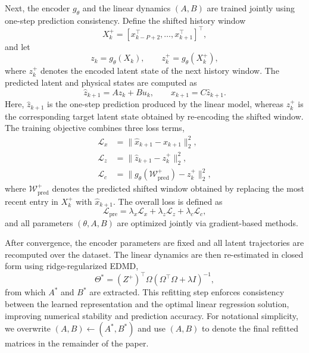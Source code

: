 \documentclass[journal]{IEEEtran}
\begin{document}
Next, the encoder $g_\theta$ and the linear dynamics $(A,B)$ are trained jointly using one-step prediction consistency. Define the shifted history window
\begin{equation}
    X_k^{+} = [x_{k-P+2}^\top,\ldots,x_{k+1}^\top]^\top,
\end{equation}
and let
\begin{equation}
    z_k = g_\theta(X_k), \qquad
    z_k^{+} = g_\theta(X_k^{+}),
\end{equation}
where $z_k^{+}$ denotes the encoded latent state of the next history window. The predicted latent and physical states are computed as
\begin{equation}
    \hat{z}_{k+1} = A z_k + B u_k,
    \qquad
    \hat{x}_{k+1} = C \hat{z}_{k+1}.
\end{equation}
Here, $\hat{z}_{k+1}$ is the one-step prediction produced by the linear model, whereas $z_k^{+}$ is the corresponding target latent state obtained by re-encoding the shifted window. The training objective combines three loss terms,
\begin{align}
    \mathcal{L}_{x} &= \|\hat{x}_{k+1}-x_{k+1}\|_2^2, \label{eq:loss_x}\\
    \mathcal{L}_{z} &= \|\hat{z}_{k+1}-z_k^{+}\|_2^2, \label{eq:loss_z}\\
    \mathcal{L}_{c} &= \bigl\|g_\theta(\mathcal{W}^{+}_{\mathrm{pred}})-z_k^{+}\bigr\|_2^2, \label{eq:loss_c}
\end{align}
where $\mathcal{W}^{+}_{\mathrm{pred}}$ denotes the predicted shifted window obtained by replacing the most recent entry in $X_k^{+}$ with $\hat{x}_{k+1}$. The overall loss is defined as
\begin{equation}
    \mathcal{L}_{\mathrm{pre}} = \lambda_x \mathcal{L}_x + \lambda_z \mathcal{L}_z + \lambda_c \mathcal{L}_c,
    \label{eq:pretraining_loss}
\end{equation}
and all parameters $(\theta, A, B)$ are optimized jointly via gradient-based methods.

After convergence, the encoder parameters are fixed and all latent trajectories are recomputed over the dataset. The linear dynamics are then re-estimated in closed form using ridge-regularized EDMD,
\begin{equation}
    \Theta^{*} = (Z^{+})^\top \Omega \left(\Omega^\top \Omega + \lambda I\right)^{-1},
\end{equation}
from which $A^{*}$ and $B^{*}$ are extracted. This refitting step enforces consistency between the learned representation and the optimal linear regression solution, improving numerical stability and prediction accuracy. For notational simplicity, we overwrite $(A,B)\leftarrow(A^{*},B^{*})$ and use $(A,B)$ to denote the final refitted matrices in the remainder of the paper.
\end{document}
